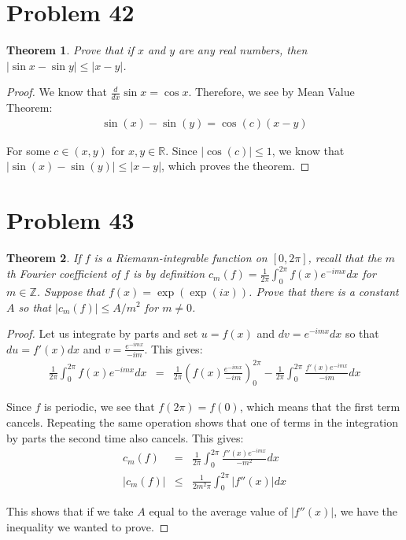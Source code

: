 \documentclass[psamsfonts]{amsart}
\newtheorem{thm}{Theorem}[section]
\theoremstyle{definition}
\theoremstyle{remark}
\numberwithin{equation}{section}
\begin{document}
\section{Problem 42}

\begin{thm}
Prove that if $x$ and $y$ are any real numbers, then $| \sin x - \sin y | \leq | x - y|$.
\end{thm}

\begin{proof}
We know that $\frac{d}{dx} \sin x = \cos x$. Therefore, we see by Mean Value Theorem:
\begin{eqnarray}
\sin(x) - \sin(y) = \cos(c) (x - y)
\end{eqnarray}

For some $c \in (x,y)$ for $x,y \in \mathbb{R}$. Since $| \cos(c) | \leq 1$, we know that $|\sin(x) - \sin(y) | \leq |x - y|$, which proves the theorem. 
\end{proof}

\section{Problem 43}

\begin{thm}
If $f$ is a Riemann-integrable function on $[0,2\pi]$, recall that the $m$th Fourier coefficient of $f$ is by definition $c_m (f) = \frac{1}{2\pi} \int_0^{2\pi} f(x) e^{-i m x} dx$ for $m \in \mathbb{Z}$. Suppose that $f(x) = \exp( \exp(ix))$. Prove that there is a constant $A$ so that $|c_m(f)| \leq A/m^2$ for $m \neq 0$. 
\end{thm}

\begin{proof}
Let us integrate by parts and set $u = f(x)$ and $dv = e^{-imx} dx$ so that $ du = f'(x) dx$ and $v = \frac{e^{-imx}}{-im}$. This gives:
\begin{eqnarray}
\frac{1}{2 \pi} \int_0^{2 \pi} f(x) e^{-imx} dx &=& \frac{1}{2 \pi} \left( f(x) \frac{ e^{-imx}}{-im} \right)_0^{2 \pi} - \frac{1}{2 \pi} \int_0^{2 \pi} \frac{f'(x) e^{-imx}}{-im} dx
\end{eqnarray}

Since $f$ is periodic, we see that $f( 2 \pi) = f(0)$, which means that the first term cancels. Repeating the same operation shows that one of terms in the integration by parts the second time also cancels. This gives:
\begin{eqnarray}
c_m (f) &=& \frac{1}{2\pi} \int_0^{2\pi} \frac{ f''(x) e^{-imx}}{-m^2} dx \\
|c_m (f) | &\leq & \frac{1}{2 m^2 \pi} \int_0^{2 \pi} |f''(x)| dx
\end{eqnarray}

This shows that if we take $A$ equal to the average value of $|f''(x)|$, we have the inequality we wanted to prove.
\end{proof}
\end{document}
